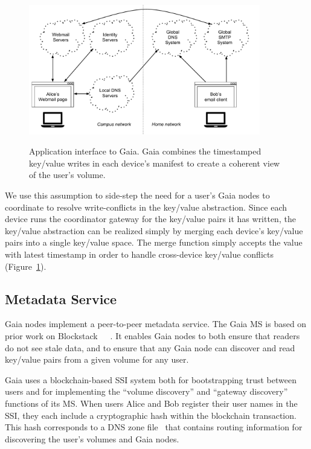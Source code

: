 \begin{figure}[h]
   \caption{Application interface to Gaia.  Gaia combines the timestamped
   key/value writes in each device's manifest to create a coherent view of the
   user's volume.}
   \centering
   \includegraphics[width=0.9\textwidth,page=17]{figures/dissertation-figures}
   \label{fig:chap3-gaia-global-key-value-store}
\end{figure}

We use this assumption to side-step the need for a user's Gaia nodes to
coordinate to resolve write-conflicts in the key/value abstraction.  Since each
device runs the coordinator gateway for the key/value pairs it has
written, the key/value abstraction can be realized simply by
merging each device's key/value pairs into a single key/value space.
The merge function simply accepts the
value with latest timestamp in order to handle cross-device
key/value conflicts (Figure~\ref{fig:chap3-gaia-global-key-value-store}).

\subsection{Metadata Service}

Gaia nodes implement a peer-to-peer metadata service.  The Gaia MS is based on prior work
on Blockstack~\cite{blockstack}~\cite{virtualchain}~\cite{ali2017}.  It enables
Gaia nodes to both ensure that readers do not see stale data, and to ensure that
any Gaia node can discover and read key/value pairs from a given volume for any user.

Gaia uses a blockchain-based SSI system both for bootstrapping trust between
users and for implementing the ``volume discovery'' and ``gateway discovery''
functions of its MS.  When users Alice and Bob 
register their user names in the SSI, they each include a cryptographic hash within the
blockchain transaction.  This hash corresponds to a DNS zone
file~\cite{rfc-zone-file} that contains routing information for discovering the
user's volumes and Gaia nodes.

